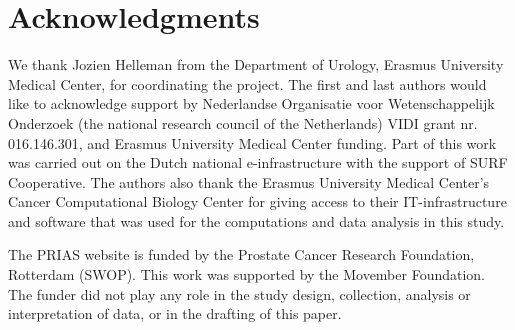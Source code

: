 \section*{Acknowledgments}
We thank Jozien Helleman from the Department of Urology, Erasmus University Medical Center, for coordinating the project. The first and last authors would like to acknowledge support by Nederlandse Organisatie voor Wetenschappelijk Onderzoek (the national research council of the Netherlands) VIDI grant nr. 016.146.301, and Erasmus University Medical Center funding. Part of this work was carried out on the Dutch national e-infrastructure with the support of SURF Cooperative. The authors also thank the Erasmus University Medical Center's Cancer Computational Biology Center for giving access to their IT-infrastructure and software that was used for the computations and data analysis in this study.

The PRIAS website is funded by the Prostate Cancer Research Foundation, Rotterdam (SWOP). This work was supported by the Movember Foundation. The funder did not play any role in the study design, collection, analysis or interpretation of data, or in the drafting of this paper.